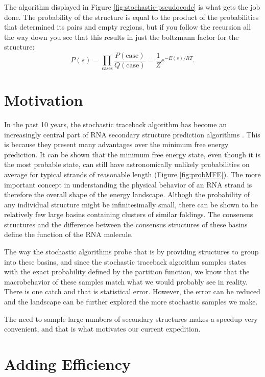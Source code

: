 The algorithm displayed in Figure \ref{fig:stochastic-pseudocode} is
what gets the job done. The probability of the structure is equal to
the product of the probabilities that determined its pairs and empty
regions, but if you follow the recursion all the way down you see that
this results in just the boltzmann factor for the structure:
\begin{equation}
P(s) = \prod_{\text{cases}} \frac{P(\text{case})}{Q(\text{case})} =
\frac{1}{Z} e^{-E(s)/RT}.
\end{equation}

\section{Motivation}

In the past 10 years, the stochastic traceback algorithm has become an
increasingly central part of RNA secondary structure prediction
algorithms \cite{mathews2006revolutions}. This is because they present
many advantages over the minimum free energy prediction. It can be
shown that the minimum free energy state, even though it is the most
probable state, can still have astronomically unlikely probabilities
on average for typical strands of reasonable length (Figure
\ref{fig:probMFE}). The more important concept in understanding the
physical behavior of an RNA strand is therefore the overall shape of
the energy landscape. Althogh the probability of any individual
structure might be infinitesimally small, there can be shown to be
relatively few large basins containing clusters of similar foldings.
The consensus structures and the difference between the consensus
structures of these basins define the function of the RNA molecule.

The way the stochastic algorithms probe that is by providing
structures to group into these basins, and since the stochastic
traceback algorithm samples states with the exact probability defined
by the partition function, we know that the macrobehavior of these
samples match what we would probably see in reality. There is one
catch and that is statistical error. However, the error can be reduced
and the landscape can be further explored the more stochastic samples
we make.

The need to sample large numbers of secondary structures makes a
speedup very convenient, and that is what motivates our current
expedition.

\section{Adding Efficiency}

